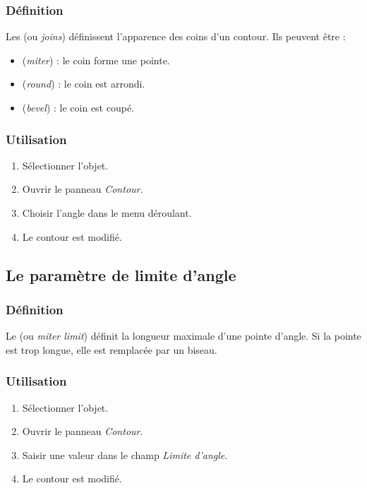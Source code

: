 \subsubsection{Définition}

Les  (ou \emph{joins}) définissent l'apparence des coins d'un contour. Ils peuvent être :

\begin{itemize}
    \item {} (\emph{miter}) : le coin forme une pointe.
    \item {} (\emph{round}) : le coin est arrondi.
    \item {} (\emph{bevel}) : le coin est coupé.
\end{itemize}

\subsubsection{Utilisation}

\begin{enumerate}
    \item Sélectionner l'objet.
    \item Ouvrir le panneau \emph{Contour}.
    \item Choisir l'angle dans le menu déroulant.
    \item Le contour est modifié.
\end{enumerate}

\subsection{Le paramètre de limite d'angle}

\subsubsection{Définition}

Le  (ou \emph{miter limit}) définit la longueur maximale d'une pointe d'angle. Si la pointe est trop longue, elle est remplacée par un biseau.

\subsubsection{Utilisation}

\begin{enumerate}
    \item Sélectionner l'objet.
    \item Ouvrir le panneau \emph{Contour}.
    \item Saisir une valeur dans le champ \emph{Limite d'angle}.
    \item Le contour est modifié.
\end{enumerate}

